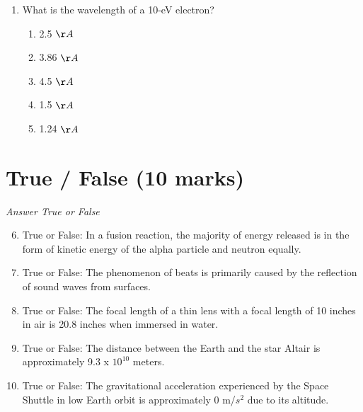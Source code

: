 \documentclass[12pt]{article}
\begin{document}
\begin{enumerate}[label=\arabic*.]
\begin{enumerate}[label=(\alph*)]
    \item rate of change of the magnetic flux through S
    \item electric flux through S
    \item rate of change of the electric current through S
    \item time integral of the magnetic flux through S
    \item rate of change of the electric flux through S
\end{enumerate}
\item What is the wavelength of a 10-eV electron?
\begin{enumerate}[label=(\alph*)]
    \item 2.5 \ensuremath{\AA}
    \item 3.86 \ensuremath{\AA}
    \item 4.5 \ensuremath{\AA}
    \item 1.5 \ensuremath{\AA}
    \item 1.24 \ensuremath{\AA}
\end{enumerate}
\end{enumerate}

\section*{True / False (10 marks)}
\textit{Answer True or False}
\begin{enumerate}[label=\arabic*.]
\setcounter{enumi}{5}
\item True or False: In a fusion reaction, the majority of energy released is in the form of kinetic energy of the alpha particle and neutron equally.
\item True or False: The phenomenon of beats is primarily caused by the reflection of sound waves from surfaces.
\item True or False: The focal length of a thin lens with a focal length of 10 inches in air is 20.8 inches when immersed in water.
\item True or False: The distance between the Earth and the star Altair is approximately 9.3 x $10^10$ meters.
\item True or False: The gravitational acceleration experienced by the Space Shuttle in low Earth orbit is approximately 0 m/$s^2$ due to its altitude.
\end{enumerate}
\end{document}
